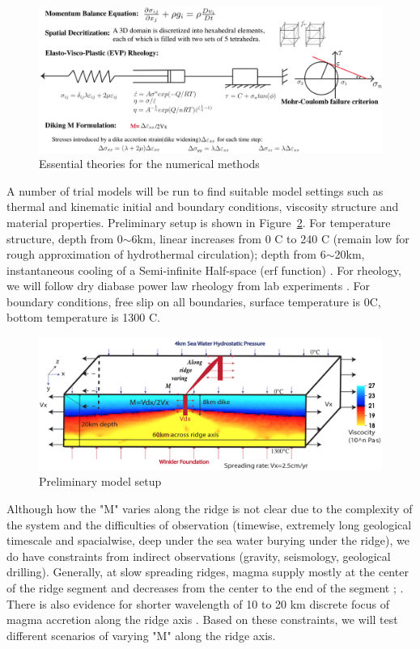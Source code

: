 \documentclass[12pt]{article}
\begin{document}
\begin{figure}[H]
 \centering
  \includegraphics[scale=0.46]{fig7_1.png}
 \caption{\small{Essential theories for the numerical methods}}
 \label{fig7_1}
\end{figure}
 
A number of trial models will be run to find suitable model settings such as thermal and kinematic initial and boundary conditions, viscosity structure and material properties. Preliminary setup is shown in Figure~\ref{fig8_1}. For temperature structure, depth from 0$\sim$6km, linear increases from 0 \degree C to 240 \degree C (remain low for rough approximation of hydrothermal circulation); depth from 6$\sim$20km, instantaneous cooling of a Semi-infinite Half-space (erf function) \citep{Turcotte2002}. For rheology, we will follow dry diabase power law rheology from lab experiments \citep{Kirby1987}. For boundary conditions, free slip on all boundaries, surface temperature is 0\degree C, bottom temperature is 1300 \degree C.


\begin{figure}[H]
 \centering
  \includegraphics[scale=0.5]{fig8_1.png}
 \caption{\small Preliminary model setup}
 \label{fig8_1}
\end{figure}


Although how the "M" varies along the ridge is not clear due to the complexity of the system and the difficulties of observation (timewise, extremely long geological timescale and spacialwise, deep under the sea water burying under the ridge), we do have constraints from indirect observations (gravity, seismology, geological drilling). Generally, at slow spreading ridges, magma supply mostly at the center of the ridge segment and decreases from the center to the end of the segment \citep{Tolstoy1993}; \citep{Chen1999}. There is also evidence for shorter wavelength of 10 to 20 km discrete focus of magma accretion along the ridge axis \citep{Lin1990}. Based on these constraints, we will test different scenarios of varying "M" along the ridge axis.
\end{document}
